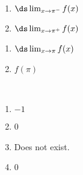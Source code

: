 {{\noindent\begin{minipage}[t]{.49\linewidth}
\begin{enumerate}
\item		$\ds \lim_{x\to \pi^-} f(x)$
\item		$\ds \lim_{x\to \pi^+} f(x)$
\end{enumerate}
\end{minipage}
\noindent\begin{minipage}[t]{.49\linewidth}
\begin{enumerate}\addtocounter{enumii}{2}
\item		$\ds \lim_{x\to \pi} f(x)$
\item		$f(\pi)$
\end{enumerate}
\end{minipage}
}{\mbox{}\\[-2\baselineskip]\begin{enumerate}
\item		$-1$
\item		0
\item		Does not exist.
\item		0
\end{enumerate}}

}
